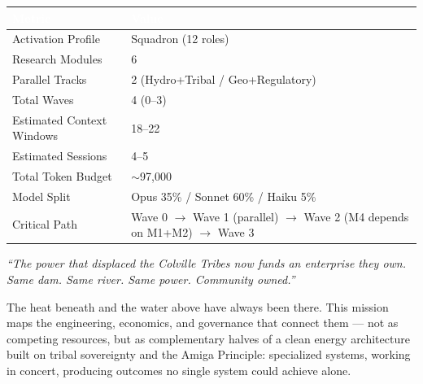 \documentclass[11pt,letterpaper]{article}
\newcommand{\tableheader}[1]{\textbf{\sffamily\textcolor{white}{#1}}}
\begin{document}
\begin{center}
\begin{tabularx}{\textwidth}{L{5cm}X}
\toprule
{}
\tableheader{Metric} & \tableheader{Value} \\
\midrule
Activation Profile & Squadron (12 roles) \\
Research Modules & 6 \\
Parallel Tracks & 2 (Hydro+Tribal / Geo+Regulatory) \\
Total Waves & 4 (0--3) \\
Estimated Context Windows & 18--22 \\
Estimated Sessions & 4--5 \\
Total Token Budget & $\sim$97,000 \\
Model Split & Opus 35\% / Sonnet 60\% / Haiku 5\% \\
Critical Path & Wave 0 $\rightarrow$ Wave 1 (parallel) $\rightarrow$ Wave 2 (M4 depends on M1+M2) $\rightarrow$ Wave 3 \\
\bottomrule
\end{tabularx}
\end{center}

\vspace{1em}

\begin{quotebox}
\textit{``The power that displaced the Colville Tribes now funds an enterprise they own. Same dam. Same river. Same power. Community owned.''}

\vspace{0.5em}

The heat beneath and the water above have always been there. This mission maps the engineering, economics, and governance that connect them --- not as competing resources, but as complementary halves of a clean energy architecture built on tribal sovereignty and the Amiga Principle: specialized systems, working in concert, producing outcomes no single system could achieve alone.
\end{quotebox}
\end{document}
